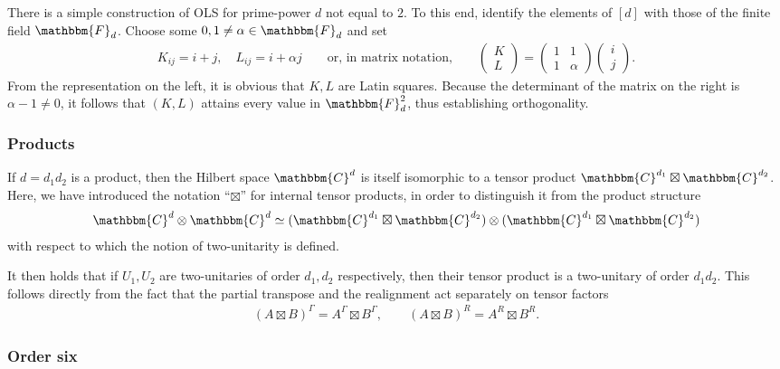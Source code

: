 \documentclass[aps,nofootinbib,floatfix,a4paper]{revtex4}
\newcommand{\1}{\mbox{$\mathbf{1}$}}
\def\CC{\mathbbm{C}}
\def\FF{\mathbbm{F}}
\begin{document}
There is a simple construction of OLS for prime-power $d$ not equal to $2$.
To this end, identify the elements of $[d]$ with those of the finite field $\FF_d$.
Choose some $0,1\neq \alpha \in \FF_d$ and set
\begin{align}\label{eqn:linear_ols}
	K_{ij} = i+j,
	\quad
	L_{ij} = i + \alpha j
	\qquad
	\text{or, in matrix notation,}
	\qquad
	\begin{pmatrix}
		K\\
		L
	\end{pmatrix}
	=
	\begin{pmatrix}
		1 & 1 \\
		1 & \alpha
	\end{pmatrix}
	\begin{pmatrix}
		i\\
		j
	\end{pmatrix}.
\end{align}
From the representation on the left, it is obvious that $K, L$ are Latin squares.
Because the determinant of the matrix on the right is $\alpha-1\neq 0$, it follows that $(K,L)$ attains every value in $\FF_d^2$, thus establishing orthogonality.


\subsubsection{Products}
\label{sec:products}

If $d=d_1 d_2$ is a product, then the Hilbert space $\CC^d$ is itself isomorphic to a tensor product $\CC^{d_1}\boxtimes \CC^{d_2}$.
Here, we have introduced the notation ``$\boxtimes$'' for internal tensor products, 
in order to distinguish it from the product structure 
\begin{align*}
	\CC^d\otimes \CC^d \simeq (\CC^{d_1} \boxtimes \CC^{d_2}) \otimes (\CC^{d_1}\boxtimes \CC^{d_2})
\end{align*}
with respect to which the notion of two-unitarity is defined.

It then holds that if $U_1, U_2$ are two-unitaries of order $d_1, d_2$ respectively, then their tensor product is a two-unitary of order $d_1 d_2$. 
This follows directly from the fact that the partial transpose and the realignment act separately on tensor factors
\begin{align*}
	(A\boxtimes B)^\Gamma 
	= 
	A^\Gamma \boxtimes B^\Gamma,
	\qquad
	(A\boxtimes B)^R
	= 
	A^R \boxtimes B^R.
\end{align*}

\subsubsection{Order six}
\end{document}
